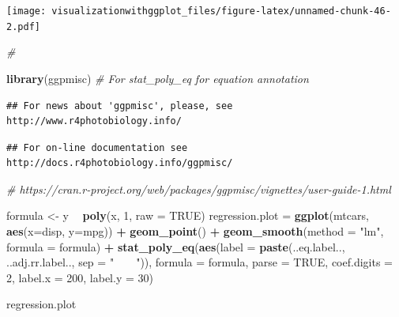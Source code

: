 \documentclass[]{krantz}
\makeatletter
\newenvironment{Shaded}{\begin{snugshade}}{\end{snugshade}}
\newcommand{\KeywordTok}[1]{\textcolor[rgb]{0.13,0.29,0.53}{\textbf{#1}}}
\newcommand{\DataTypeTok}[1]{\textcolor[rgb]{0.13,0.29,0.53}{#1}}
\newcommand{\DecValTok}[1]{\textcolor[rgb]{0.00,0.00,0.81}{#1}}
\newcommand{\StringTok}[1]{\textcolor[rgb]{0.31,0.60,0.02}{#1}}
\newcommand{\CommentTok}[1]{\textcolor[rgb]{0.56,0.35,0.01}{\textit{#1}}}
\newcommand{\OtherTok}[1]{\textcolor[rgb]{0.56,0.35,0.01}{#1}}
\newcommand{\OperatorTok}[1]{\textcolor[rgb]{0.81,0.36,0.00}{\textbf{#1}}}
\newcommand{\NormalTok}[1]{#1}
\newenvironment{kframe}{%
\medskip{}
\setlength{\fboxsep}{.8em}
 \def\at@end@of@kframe{}%
 \ifinner\ifhmode%
  \def\at@end@of@kframe{\end{minipage}}%
  \begin{minipage}{\columnwidth}%
 \fi\fi%
 \def\FrameCommand##1{\hskip\@totalleftmargin \hskip-\fboxsep
 \colorbox{shadecolor}{##1}\hskip-\fboxsep
     \hskip-\linewidth \hskip-\@totalleftmargin \hskip\columnwidth}%
 \MakeFramed {\advance\hsize-\width
   \@totalleftmargin\z@ \linewidth\hsize
   \@setminipage}}%
 {\par\unskip\endMakeFramed%
 \at@end@of@kframe}
\renewenvironment{Shaded}{\begin{kframe}}{\end{kframe}}
\theoremstyle{definition}
\theoremstyle{definition}
\theoremstyle{definition}
\theoremstyle{remark}
\makeatother
\begin{document}
\texttt{[image: visualizationwithggplot\_files/figure-latex/unnamed-chunk-46-2.pdf]}

\begin{Shaded}
\begin{Highlighting}[]
\CommentTok{#}

\KeywordTok{library}\NormalTok{(ggpmisc) }\CommentTok{# For stat_poly_eq for equation annotation  }
\end{Highlighting}
\end{Shaded}

\begin{verbatim}
## For news about 'ggpmisc', please, see http://www.r4photobiology.info/
\end{verbatim}

\begin{verbatim}
## For on-line documentation see http://docs.r4photobiology.info/ggpmisc/
\end{verbatim}

\begin{Shaded}
\begin{Highlighting}[]
\CommentTok{# https://cran.r-project.org/web/packages/ggpmisc/vignettes/user-guide-1.html}

\NormalTok{formula <-}\StringTok{ }\NormalTok{y }\OperatorTok{~}\StringTok{ }\KeywordTok{poly}\NormalTok{(x, }\DecValTok{1}\NormalTok{, }\DataTypeTok{raw =} \OtherTok{TRUE}\NormalTok{)}
\NormalTok{regression.plot =}
\StringTok{  }\KeywordTok{ggplot}\NormalTok{(mtcars, }\KeywordTok{aes}\NormalTok{(}\DataTypeTok{x=}\NormalTok{disp, }\DataTypeTok{y=}\NormalTok{mpg)) }\OperatorTok{+}\StringTok{ }
\StringTok{    }\KeywordTok{geom_point}\NormalTok{() }\OperatorTok{+}
\StringTok{  }\KeywordTok{geom_smooth}\NormalTok{(}\DataTypeTok{method =} \StringTok{"lm"}\NormalTok{, }\DataTypeTok{formula =}\NormalTok{ formula) }\OperatorTok{+}
\StringTok{  }\KeywordTok{stat_poly_eq}\NormalTok{(}\KeywordTok{aes}\NormalTok{(}\DataTypeTok{label =}  \KeywordTok{paste}\NormalTok{(..eq.label.., ..adj.rr.label.., }\DataTypeTok{sep =} \StringTok{"~~~~"}\NormalTok{)),}
                   \DataTypeTok{formula =}\NormalTok{ formula, }\DataTypeTok{parse =} \OtherTok{TRUE}\NormalTok{, }\DataTypeTok{coef.digits =} \DecValTok{2}\NormalTok{, }\DataTypeTok{label.x =} \DecValTok{200}\NormalTok{, }\DataTypeTok{label.y =} \DecValTok{30}\NormalTok{)}

\NormalTok{regression.plot }
\end{Highlighting}
\end{Shaded}
\end{document}
